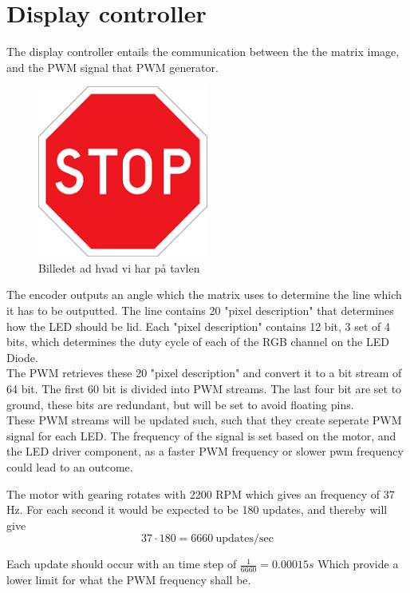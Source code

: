 \section{Display controller}
The display controller entails the communication between the the matrix image, and the PWM signal that PWM generator. 


\begin{figure}[H]
	\center
	\includegraphics[width = 0.5\textwidth]{images/stop}
	\caption{Billedet ad hvad vi har på tavlen}
	\label{fig:Image_controller_setup}
\end{figure}

The encoder outputs an angle which the matrix uses to determine the line which it has to be outputted.  The line contains 20 "pixel description" that determines how the LED should be lid.  Each "pixel description" contains 12 bit, 3 set of 4 bits, which determines the duty cycle of each of the RGB channel on the LED Diode.  \\

The PWM retrieves these 20 "pixel description" and convert it to a bit stream of 64 bit.  
The first 60 bit is divided into PWM streams. The last four bit are set to ground,  these bits are redundant, but will be set to avoid floating pins. \\

These PWM streams will be updated such, such that they create seperate PWM signal for each LED.  The frequency of the signal is set based on the motor, and the LED driver component, as a faster PWM frequency or slower pwm frequency could lead to an outcome. 

The motor with gearing rotates with 2200 RPM which gives an frequency of 37 Hz.	
For each second it would be expected to be 180 updates, and thereby will give 
$$37 \cdot 180 = 6660 ~\text{updates/sec}$$

Each update should occur with an time step of $\frac{1}{6660} = 0.00015s$ Which provide a lower limit for what the PWM frequency shall be.  \\

